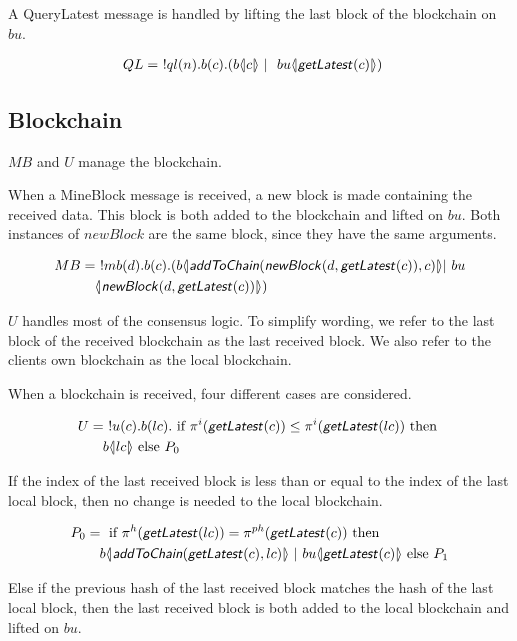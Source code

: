 A QueryLatest message is handled by lifting the last block of the blockchain on $bu$.

\begin{align*}
	QL &=\ !ql(n).b(c).(b \lift{}{c}\ |\ \ bu\lift{}{\mop{getLatest}(c)})
\end{align*}

\subsection{Blockchain}

$MB$ and $U$ manage the blockchain.

When a MineBlock message is received, a new block is made containing the received data.
This block is both added to the blockchain and lifted on $bu$.
Both instances of $newBlock$ are the same block, since they have the same arguments.

\begin{align*}
    MB &=\ !mb(d).b(c).(b \lift{}{\mop{addToChain}(\mop{newBlock}(d,\mop{getLatest}(c)),c)}| \ bu\\
    &\quad \lift{}{\mop{newBlock}(d, \mop{getLatest}(c))})
\end{align*}

$U$ handles most of the consensus logic.
To simplify wording, we refer to the last block of the received blockchain as the last received block.
We also refer to the clients own blockchain as the local blockchain.

When a blockchain is received, four different cases are considered.

\begin{align*}
	U &=\ !u(c).b(lc).\text{ if }\pi^{i}( \text{\sffamily \textit{getLatest}\normalfont}(c)) \leq \pi^{i}(\text{\sffamily \textit{getLatest}\normalfont}(lc))\text{ then }\\
	&\quad b \langle \! | lc | \! \rangle\text{ else }P_0
\end{align*}

If the index of the last received block is less than or equal to the index of the last local block, then no change is needed to the local blockchain.

\begin{align*}
	P_0 &=\If{\pi^{h}(\mop{getLatest}(lc))=\pi^{ph}(\mop{getLatest}(c))}{\\
	&\quad b\lift{}{\mop{addToChain}(\mop{getLatest}(c),lc)}\ | \ bu\lift{}{\mop{getLatest}(c)}}{P_1}
\end{align*}

Else if the previous hash of the last received block matches the hash of the last local block, then the last received block is both added to the local blockchain and lifted on $bu$.

